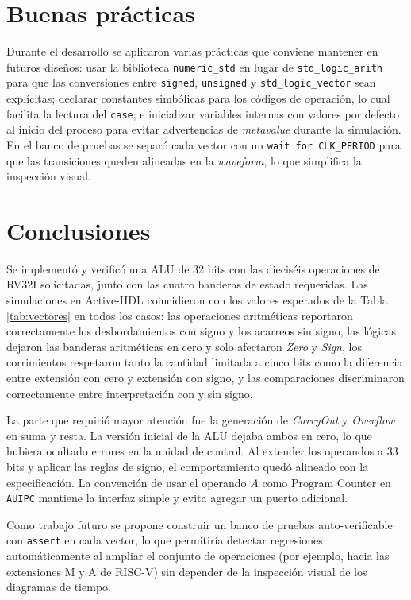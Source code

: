\documentclass[12pt,letterpaper]{article}
\begin{document}
\section{Buenas prácticas}
Durante el desarrollo se aplicaron varias prácticas que conviene mantener en futuros diseños: usar la biblioteca \texttt{numeric\_std} en lugar de \texttt{std\_logic\_arith} para que las conversiones entre \texttt{signed}, \texttt{unsigned} y \texttt{std\_logic\_vector} sean explícitas; declarar constantes simbólicas para los códigos de operación, lo cual facilita la lectura del \texttt{case}; e inicializar variables internas con valores por defecto al inicio del proceso para evitar advertencias de \textit{metavalue} durante la simulación. En el banco de pruebas se separó cada vector con un \texttt{wait for CLK\_PERIOD} para que las transiciones queden alineadas en la \textit{waveform}, lo que simplifica la inspección visual.

\section{Conclusiones}
Se implementó y verificó una ALU de 32 bits con las dieciséis operaciones de RV32I solicitadas, junto con las cuatro banderas de estado requeridas. Las simulaciones en Active-HDL coincidieron con los valores esperados de la Tabla \ref{tab:vectores} en todos los casos: las operaciones aritméticas reportaron correctamente los desbordamientos con signo y los acarreos sin signo, las lógicas dejaron las banderas aritméticas en cero y solo afectaron \textit{Zero} y \textit{Sign}, los corrimientos respetaron tanto la cantidad limitada a cinco bits como la diferencia entre extensión con cero y extensión con signo, y las comparaciones discriminaron correctamente entre interpretación con y sin signo.

La parte que requirió mayor atención fue la generación de \textit{CarryOut} y \textit{Overflow} en suma y resta. La versión inicial de la ALU dejaba ambos en cero, lo que hubiera ocultado errores en la unidad de control. Al extender los operandos a 33 bits y aplicar las reglas de signo, el comportamiento quedó alineado con la especificación. La convención de usar el operando $A$ como Program Counter en \texttt{AUIPC} mantiene la interfaz simple y evita agregar un puerto adicional.

Como trabajo futuro se propone construir un banco de pruebas auto-verificable con \texttt{assert} en cada vector, lo que permitiría detectar regresiones automáticamente al ampliar el conjunto de operaciones (por ejemplo, hacia las extensiones M y A de RISC-V) sin depender de la inspección visual de los diagramas de tiempo.
\end{document}

